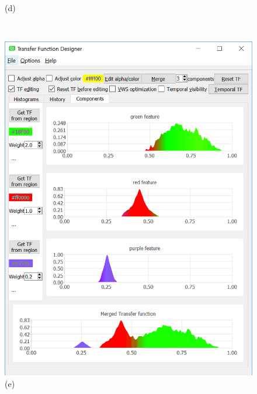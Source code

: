 \documentclass[twoside,twocolumn,10pt]{article}
\begin{document}
\begin{figure}
\begin{minipage}{.16\textwidth}
		(d)
	\end{minipage}~
	\begin{minipage}{.16\textwidth}
		\centering
		\includegraphics[width=1\linewidth]{tf_vortex_merged_segment_blend_green_red_purple}
		(e)
	\end{minipage}~
	\begin{minipage}{.16\textwidth}
		\centering

\end{minipage}
\end{figure}
\end{document}
